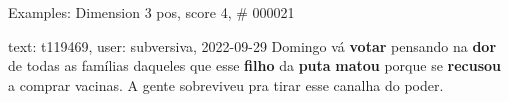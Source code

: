\begin{frame}{Examples: Dimension 3 pos, score 4, \# 000021}
\footnotesize
\begin{exampleblock}{text: t119469, user: subversiva, 2022-09-29}
Domingo vá \textbf{votar} pensando na \textbf{dor} de todas as famílias 
daqueles que esse \textbf{filho} da \textbf{puta} \textbf{matou} porque se 
\textbf{recusou} a comprar vacinas. A gente sobreviveu pra tirar esse canalha 
do poder. 
\end{exampleblock}
\end{frame}
